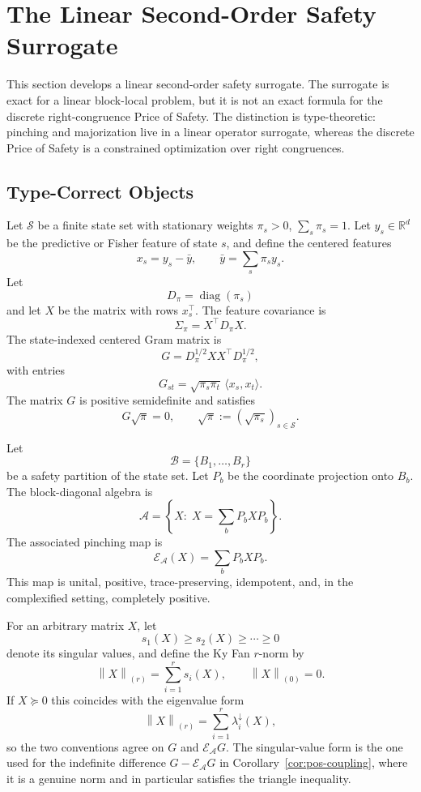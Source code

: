 \documentclass[12pt]{article}
\theoremstyle{definition}
\newcommand{\EA}{\mathcal E_{\mathcal A}}
\newcommand{\KyF}[2]{\left\|#1\right\|_{(#2)}}
\begin{document}
\section{The Linear Second-Order Safety Surrogate}
\label{sec:pos-linear}

This section develops a linear second-order safety surrogate.  The surrogate
is exact for a linear block-local problem, but it is not an exact formula for
the discrete right-congruence Price of Safety.  The distinction is
type-theoretic: pinching and majorization live in a linear operator surrogate,
whereas the discrete Price of Safety is a constrained optimization over right
congruences.

\subsection{Type-Correct Objects}
\label{subsec:pos-objects}

Let $\mathcal S$ be a finite state set with stationary weights
$\pi_s>0$, $\sum_s\pi_s=1$.  Let $y_s\in\mathbb R^d$ be the predictive or
Fisher feature of state $s$, and define the centered features
\[
x_s=y_s-\bar y,
\qquad
\bar y=\sum_s\pi_s y_s.
\]
Let
\[
D_\pi=\operatorname{diag}(\pi_s)
\]
and let $X$ be the matrix with rows $x_s^\top$.  The feature covariance is
\[
\Sigma_\pi
=
X^\top D_\pi X.
\]
The state-indexed centered Gram matrix is
\[
G
=
D_\pi^{1/2}XX^\top D_\pi^{1/2},
\]
with entries
\[
G_{st}
=
\sqrt{\pi_s\pi_t}\,
\langle x_s,x_t\rangle.
\]
The matrix $G$ is positive semidefinite and satisfies
\[
G\sqrt{\pi}=0,
\qquad
\sqrt{\pi}:=(\sqrt{\pi_s})_{s\in\mathcal S}.
\]

Let
\[
\mathcal B=\{B_1,\dots,B_r\}
\]
be a safety partition of the state set.  Let $P_b$ be the coordinate projection
onto $B_b$.  The block-diagonal algebra is
\[
\mathcal A
=
\left\{
X:\;X=\sum_b P_bXP_b
\right\}.
\]
The associated pinching map is
\[
\EA(X)
=
\sum_b P_bXP_b.
\]
This map is unital, positive, trace-preserving, idempotent, and, in the
complexified setting, completely positive.

For an arbitrary matrix $X$, let
\[
s_1(X)\ge s_2(X)\ge\cdots\ge0
\]
denote its singular values, and define the Ky Fan $r$-norm by
\[
\KyF{X}{r}
=
\sum_{i=1}^r
s_i(X),
\qquad
\KyF{X}{0}=0.
\]
If $X\succeq0$ this coincides with the eigenvalue form
\[
\KyF{X}{r}
=
\sum_{i=1}^r
\lambda_i^\downarrow(X),
\]
so the two conventions agree on $G$ and $\EA G$.  The singular-value form is
the one used for the indefinite difference $G-\EA G$ in
Corollary~\ref{cor:pos-coupling}, where it is a genuine norm and in
particular satisfies the triangle inequality.
\end{document}
